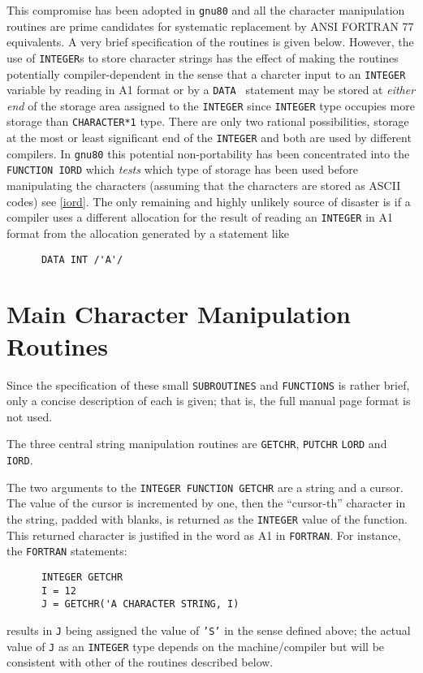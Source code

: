 This compromise has been adopted in {\tt gnu80} and all the character
manipulation routines are prime candidates for systematic replacement
by ANSI FORTRAN 77 equivalents. A very brief specification of the 
routines is given below.
However, the use of {\tt INTEGER}s to store character strings has the
effect of making the routines potentially compiler-dependent in the
sense that a charcter input to an {\tt INTEGER} variable by
reading in A1 format or by a {\tt DATA } statement may
be stored at {\em either end} of the storage area 
assigned to the {\tt INTEGER} since {\tt INTEGER} type occupies more
storage than {\tt CHARACTER*1} type.
There are only two rational possibilities, storage at the most or
least significant end of the {\tt INTEGER} and both are used by
different compilers. In {\tt gnu80} this potential non-portability
has been concentrated into the {\tt FUNCTION IORD}
which {\em tests} which type of storage has been used before
manipulating the characters (assuming that the
characters are stored as ASCII codes) see \ref{iord}. 
The only remaining and highly unlikely
source of disaster is if a compiler uses a different allocation
for the result of reading an {\tt INTEGER} in
A1 format from the allocation generated by a statement like \\
\begin{verbatim}
      DATA INT /'A'/
\end{verbatim} 
\section{\sf Main Character Manipulation Routines}
Since the specification of these small {\tt SUBROUTINES} and
{\tt FUNCTIONS} is rather brief, only a concise description of each
is given; that is, the full manual page format is not used.

The three central string manipulation routines are {\tt GETCHR}, {\tt PUTCHR}
{\tt LORD} and {\tt IORD}. 

The two arguments to the {\tt INTEGER  FUNCTION  GETCHR} are a string
and a cursor. The value of the cursor is incremented by one, then the
``cursor-th''  character in the string, padded with blanks, 
is returned as
the {\tt INTEGER} value of the function. 
This returned character is justified in the
word as A1 in {\tt FORTRAN}.
For instance, the {\tt FORTRAN} statements:
\begin{verbatim}
      INTEGER GETCHR
      I = 12
      J = GETCHR('A CHARACTER STRING, I)
\end{verbatim}
results in {\tt J} being assigned the value of {\tt 'S'} in the sense
defined above; the actual value of {\tt J} as an {\tt INTEGER} type
depends on the machine/compiler but will be consistent with other
of the routines described below.

